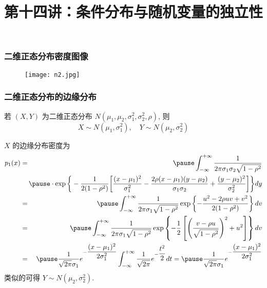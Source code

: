 \begin{frame}
	\frametitle{二维正态分布密度图像}
	\vspace{0.2cm}
	\begin{figure}[h]
		\centering
		\texttt{[image: n2.jpg]}
	\end{figure}
\end{frame}
\begin{frame}
	\frametitle{二维正态分布的边缘分布}
	\vspace{-0.3cm}
	\begin{thm}
		若 $(X,Y)$ 为二维正态分布 $N (\mu_1,\mu_2,\sigma_1^2,\sigma_2^2,\rho)$, 则 $$X\sim N (\mu_1,\sigma_1^2), \quad Y\sim N (\mu_2,\sigma_2^2)$$
	\end{thm}
	\vspace{-0.1cm}
	\pause\zheng $X$ 的边缘分布密度为
	{\small \begin{eqnarray*}
			p_1(x)&=&\pause \int_{-\infty}^{+\infty}\dfrac{1}{2\pi \sigma_1\sigma_2\sqrt{1-\rho^2}}\\
			&&\hspace{-0.3cm}\pause\cdot \exp\bigg\{-\dfrac{1}{2(1-\rho^2)}\bigg[\dfrac{(x-\mu_1)^2}{\sigma_1^2}-\dfrac{2\rho(x-\mu_1)(y-\mu_2)}{\sigma_1\sigma_2}+\dfrac{(y-\mu_2)^2}{\sigma_2^2}\bigg]\bigg\}dy\\
			&=&\pause \int_{-\infty}^{+\infty}\dfrac{1}{2\pi \sigma_1\sqrt{1-\rho^2}}\exp\left\{-\dfrac{u^2-2\rho uv+v^2}{2(1-\rho^2)}\right\}dv\\
			&=&\pause \int_{-\infty}^{+\infty}\dfrac{1}{2\pi \sigma_1\sqrt{1-\rho^2}}\exp\left\{-\dfrac{1}{2}\left[\left(\dfrac{v-\rho u}{\sqrt{1-\rho^2}}\right)^2+u^2\right]\right\}dv\\
			&=&\pause \dfrac{1}{\sqrt{2\pi}\sigma_1}e^{-\dfrac{(x-\mu_1)^2}{2\sigma_1^2}}\int_{-\infty}^{+\infty}\dfrac{1}{\sqrt{2\pi}} e^{-\dfrac{t^2}{2}}dt=\pause \dfrac{1}{\sqrt{2\pi}\sigma_1}e^{-\dfrac{(x-\mu_1)^2}{2\sigma_1^2}}
	\end{eqnarray*}}
	\pause 类似的可得 $Y\sim N (\mu_2,\sigma_2^2)$.
\end{frame}








\title[概率论]{第十四讲：条件分布与随机变量的独立性}
\date{}






